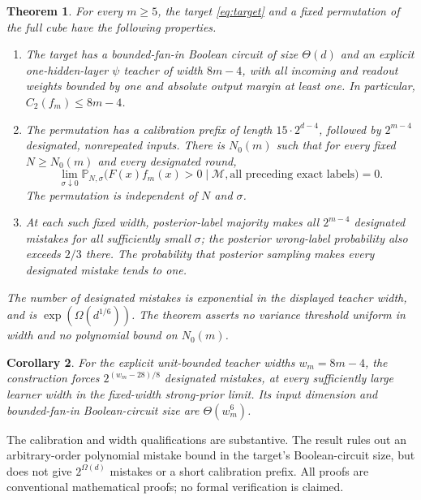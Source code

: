\documentclass[11pt]{article}
\newtheorem{theorem}{Theorem}
\newtheorem{corollary}[theorem]{Corollary}
\newcommand{\Pp}{\mathbb P}
\begin{document}
\begin{theorem}\label{thm:main}
For every $m\ge5$, the target \eqref{eq:target} and a fixed permutation
of the full cube have the following properties.
\begin{enumerate}
\item The target has a bounded-fan-in Boolean circuit of size
$\Theta(d)$ and an explicit one-hidden-layer $\psi$ teacher of
width $8m-4$, with all incoming and readout weights bounded by one and
absolute output margin at least one.
In particular, $C_2(f_m)\le8m-4$.
\item The permutation has a calibration prefix of length
$15\cdot2^{d-4}$, followed by $2^{m-4}$ designated, nonrepeated inputs.
There is $N_0(m)$ such that for every fixed $N\ge N_0(m)$ and every
designated round,
\begin{equation}\label{eq:posteriorlimit}
 \lim_{\sigma\downarrow0}
 \Pp_{N,\sigma}\bigl(F(x)f_m(x)>0\mid\mathcal M,
       \text{all preceding exact labels}\bigr)=0.
\end{equation}
The permutation is independent of $N$ and $\sigma$.
\item At each such fixed width, posterior-label majority makes all
$2^{m-4}$ designated mistakes for all sufficiently small $\sigma$;
the posterior wrong-label probability also exceeds $2/3$ there.
The probability that posterior sampling makes every designated mistake
tends to one.
\end{enumerate}
The number of designated mistakes is exponential in the displayed
teacher width, and is $\exp(\Omega(d^{1/6}))$. The theorem asserts no
variance threshold uniform in width and no polynomial bound on $N_0(m)$.
\end{theorem}

\begin{corollary}\label{cor:width}
For the explicit unit-bounded teacher widths $w_m=8m-4$, the construction
forces $2^{(w_m-28)/8}$ designated mistakes, at every sufficiently large
learner width in the fixed-width strong-prior limit. Its input dimension
and bounded-fan-in Boolean-circuit size are $\Theta(w_m^6)$.
\end{corollary}

The calibration and width qualifications are substantive. The result
rules out an arbitrary-order polynomial mistake bound in the target's
Boolean-circuit size, but does not give $2^{\Omega(d)}$ mistakes or a
short calibration prefix. All proofs are conventional mathematical
proofs; no formal verification is claimed.
\end{document}
